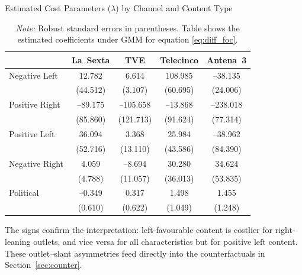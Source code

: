 \documentclass[12pt]{article}
\begin{document}
\begin{table}[H]
	\caption{Estimated Cost Parameters ($\lambda$) by Channel and Content Type}
	\label{table:costs}
	\centering\small
	\begin{tabular}{lcccc}
		\toprule
		& La~Sexta & TVE & Telecinco & Antena~3 \\
		\midrule
		Negative Left   
		& 12.782   &  6.614   & 108.985   & --38.135  \\
		& (44.512) & (3.107)  & (60.695)  & (24.006)  \\
				\midrule
		Positive Right  
		& --89.175 & --105.658 & --13.868  & --238.018 \\
		& (85.860) & (121.713) & (91.624)  & (77.314)  \\
		\midrule
		Positive Left   
		& 36.094   &  3.368   &  25.984   & --38.962  \\
		& (52.716) & (13.110) & (43.586)  & (84.390)  \\
				\midrule
		Negative Right  
		&  4.059   & --8.694  &  30.280   &  34.624   \\
		& (4.788)  & (11.057) & (36.013)  & (53.835)  \\
		\midrule
		Political 
		& --0.349  &  0.317   &   1.498   &   1.455   \\
		& (0.610)  & (0.622)  &  (1.049)  &  (1.248)  \\
		\bottomrule
	\end{tabular}
	\vspace{0.5em}
	\caption*{\scriptsize\emph{Note:} Robust standard errors in parentheses. Table shows the estimated coefficients under GMM for equation \ref{eq:diff_foc}.}
\end{table}



The signs confirm the interpretation: left-favourable content is costlier for right-leaning outlets, and vice versa for all characteristics but for positive left content. 
These outlet–slant asymmetries feed directly into the counterfactuals in Section~\ref{sec:counter}.
\end{document}
